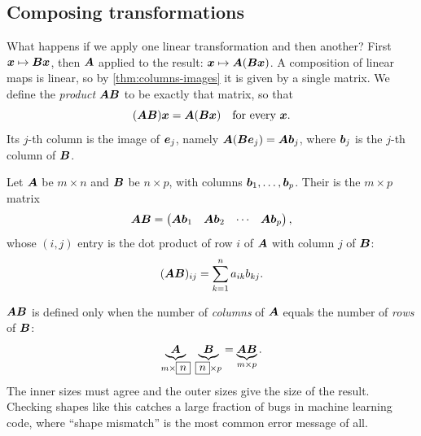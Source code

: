 \subsection{Composing transformations}

What happens if we apply one linear transformation and then another? First
$\bm{x} \mapsto \bm{B}\bm{x}$, then $\bm{A}$ applied to the result: $\bm{x} \mapsto
\bm{A}(\bm{B}\bm{x})$. A composition of linear maps is linear, so by
\cref{thm:columns-images} it is given by a single matrix. We define the
\emph{product} $\bm{A}\bm{B}$ to be exactly that matrix, so that
\[
  (\bm{A}\bm{B})\bm{x} = \bm{A}(\bm{B}\bm{x}) \quad\text{for every } \bm{x} .
\]
Its $j$-th column is the image of $\bm{e}_j$, namely $\bm{A}(\bm{B}\bm{e}_j) = \bm{A}\bm{b}_j$,
where $\bm{b}_j$ is the $j$-th column of $\bm{B}$.

\begin{definition}\label{def:matrix-product}
Let $\bm{A}$ be $m\times n$ and $\bm{B}$ be $n\times p$, with columns
$\bm{b}_1, \dots, \bm{b}_p$. Their  is the
$m\times p$ matrix
\[
  \bm{A}\bm{B} = \begin{pmatrix} \bm{A}\bm{b}_1 & \bm{A}\bm{b}_2 & \cdots & \bm{A}\bm{b}_p\end{pmatrix},
\]
whose $(i, j)$ entry is the dot product of row $i$ of $\bm{A}$ with column $j$ of
$\bm{B}$:
\[
  (\bm{A}\bm{B})_{ij} = \sum_{k=1}^{n} a_{ik}b_{kj} .
\]
\end{definition}

\begin{pitfall}
$\bm{A}\bm{B}$ is defined only when the number of \emph{columns} of $\bm{A}$ equals the
number of \emph{rows} of $\bm{B}$:
\[
  \underbrace{\bm{A}}_{m\times \boxed{n}}\;\underbrace{\bm{B}}_{\boxed{n}\times p}
  = \underbrace{\bm{A}\bm{B}}_{m\times p}.
\]
The inner sizes must agree and the outer sizes give the size of the result.
Checking shapes like this catches a large fraction of bugs in machine learning
code, where ``shape mismatch'' is the most common error message of all.
\end{pitfall}

